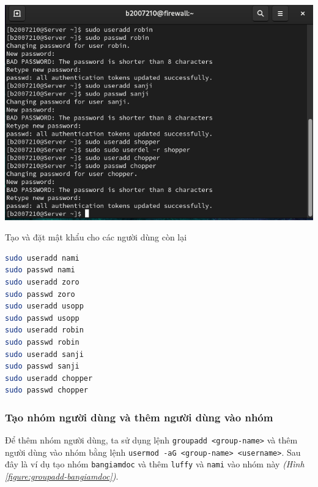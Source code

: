 \documentclass[a4paper, 11pt]{article}
\begin{document}
\begin{minipage}
    {\linewidth}
    \captionsetup{type=figure}
    \centering
    \includegraphics[width=\linewidth]{images/useradd-other.png}
    \caption{Tạo và đặt mật khẩu cho các người dùng còn lại}
    \label{figure:useradd-other}
\end{minipage}

\begin{lstlisting}[language=bash, caption=Tạo và đặt mật khẩu cho các người dùng còn lại]
sudo useradd nami
sudo passwd nami
sudo useradd zoro
sudo passwd zoro
sudo useradd usopp
sudo passwd usopp
sudo useradd robin
sudo passwd robin
sudo useradd sanji
sudo passwd sanji
sudo useradd chopper
sudo passwd chopper
\end{lstlisting}

\subsubsection{Tạo nhóm người dùng và thêm người dùng vào nhóm}

Để thêm nhóm người dùng, ta sử dụng lệnh \texttt{groupadd <group-name>} và thêm người dùng vào nhóm bằng lệnh \texttt{usermod -aG <group-name> <username>}.
Sau đây là ví dụ tạo nhóm \texttt{bangiamdoc} và thêm \texttt{luffy} và \texttt{nami} vào nhóm này \textit{(Hình \ref{figure:groupadd-bangiamdoc})}.
\end{document}

